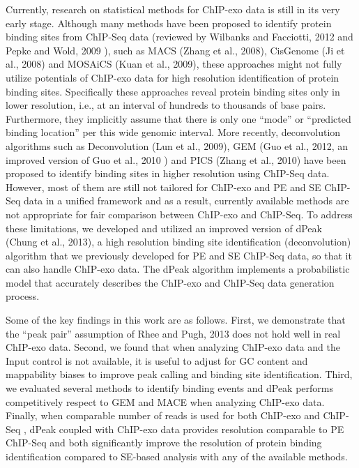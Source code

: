 \documentclass{bmcart}\usepackage[]{graphicx}\usepackage[]{color}
\begin{document}
Currently, research on statistical methods for ChIP-exo data is still
in its very early stage. Although many methods have been proposed to
identify protein binding sites from ChIP-Seq data (reviewed by
Wilbanks and Facciotti, 2012\nocite{evaluation} and Pepke and Wold,
2009 \nocite{computation}), such as MACS (Zhang et al.,
2008\nocite{macs}), CisGenome (Ji et al., 2008\nocite{cisgenome}) and
MOSAiCS (Kuan et al., 2009\nocite{mosaics}), these approaches might
not fully utilize potentials of ChIP-exo data for high resolution
identification of protein binding sites. Specifically these approaches
reveal protein binding sites only in lower resolution, i.e., at an
interval of hundreds to thousands of base pairs. Furthermore, they
implicitly assume that there is only one ``mode'' or ``predicted
binding location'' per this wide genomic interval. More recently,
deconvolution algorithms such as Deconvolution (Lun et al.,
2009\cite{csdeconv}), GEM (Guo et al., 2012\nocite{gem}, an improved
version of Guo et al., 2010\nocite{gps} ) and PICS (Zhang et al.,
2010\nocite{pics}) have been proposed to identify binding sites in
higher resolution using ChIP-Seq data. However, most of them are still
not tailored for ChIP-exo and PE and SE ChIP-Seq data in a unified
framework and as a result, currently available methods are not
appropriate for fair comparison between ChIP-exo and ChIP-Seq. To
address these limitations, we developed and utilized an improved
version of dPeak (Chung et al., 2013\nocite{dpeak}), a high resolution
binding site identification (deconvolution) algorithm that we
previously developed for PE and SE ChIP-Seq data, so that it can also
handle ChIP-exo data. The dPeak algorithm implements a probabilistic
model that accurately describes the ChIP-exo and ChIP-Seq data
generation process.

Some of the key findings in this work are as follows. First, we
demonstrate that the ``peak pair'' assumption of Rhee and Pugh,
2013\nocite{exo2} does not hold well in real ChIP-exo data. Second, we
found that when analyzing ChIP-exo data and the Input control is not
available, it is useful to adjust for GC content and mappability
biases to improve peak calling and binding site identification. Third,
we evaluated several methods to identify binding events and dPeak
performs competitively respect to GEM and MACE when analyzing ChIP-exo
data. Finally, when comparable number of reads is used for both
ChIP-exo and ChIP-Seq , dPeak coupled with ChIP-exo data provides
resolution comparable to PE ChIP-Seq and both significantly improve
the resolution of protein binding identification compared to SE-based
analysis with any of the available methods.
\end{document}
